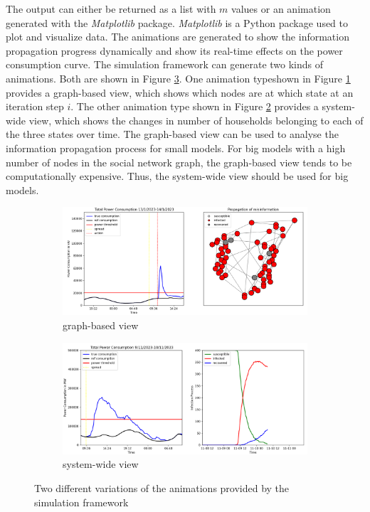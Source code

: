 The output can either be returned as a list with $m$ values
or an animation generated with the \textit{Matplotlib} package.
\textit{Matplotlib} is a Python package used to plot and visualize 
data. The animations are generated to show the information propagation
progress dynamically and show its real-time effects on the power
consumption curve. The simulation framework can generate two 
kinds of animations. Both are shown in Figure \ref{both-anim-views}.
One animation typeshown in Figure \ref{graph-view}
provides a graph-based view, which 
shows which nodes are at which state at an iteration step $i$.
The other animation type shown in Figure \ref{system-view}
provides a system-wide view, which shows
the changes in number of households belonging to each of the three
states over time.
The graph-based view can be used to analyse the information propagation
process for small models. For big models with a high number of nodes
in the social network graph, the graph-based view tends to be 
computationally expensive. Thus, the system-wide view should be used
for big models.


\begin{figure}[!ht]
    \begin{subfigure}{\textwidth}
    \centering
    \includegraphics[scale=.5]{figs/graph-wide-view.png}
    \caption{graph-based view}
    \label{graph-view} 
    \end{subfigure}
    \begin{subfigure}{\textwidth}
    \centering
    \includegraphics[scale=.505]{figs/system-wide-view.png}
    \caption{system-wide view}
    \label{system-view}
    \end{subfigure}
    \caption{Two different variations of the animations provided
    by the simulation framework}
    \label{both-anim-views}
\end{figure}



